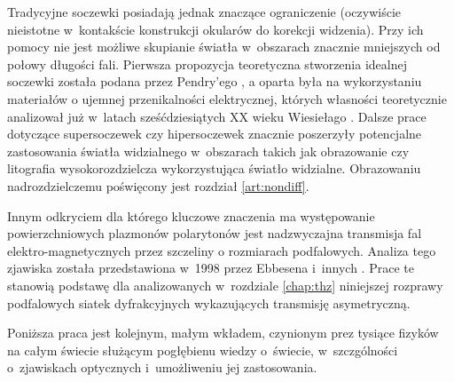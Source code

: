 Tradycyjne soczewki posiadają jednak znaczące ograniczenie (oczywiście nieistotne w~kontakście konstrukcji okularów do korekcji widzenia). Przy ich pomocy nie jest możliwe skupianie światła w~obszarach znacznie mniejszych od połowy długości fali. Pierwsza propozycja teoretyczna stworzenia idealnej soczewki została podana przez Pendry'ego \cite{PhysRevLett.85.3966}, a oparta była na wykorzystaniu materiałów o ujemnej przenikalności elektrycznej, których własności teoretycznie analizował już w~latach sześćdziesiątych XX wieku Wiesiełago \cite{veselago1968electrodynamics}. Dalsze prace dotyczące supersoczewek czy hipersoczewek \cite{liu2007far} znacznie poszerzyły potencjalne zastosowania światła widzialnego w~obszarach takich jak obrazowanie czy litografia wysokorozdzielcza wykorzystująca światło widzialne. Obrazowaniu nadrozdzielczemu poświęcony jest rozdział \ref{art:nondiff}.

Innym odkryciem dla którego kluczowe znaczenia ma występowanie powierzchniowych plazmonów polarytonów jest nadzwyczajna transmisja fal elektro-magnetycznych przez szczeliny o rozmiarach podfalowych. Analiza tego zjawiska została przedstawiona w~1998 przez Ebbesena i~innych \cite{ebbesen1998extraordinary,1998APS..MAR.S1511E}. Prace te stanowią podstawę dla analizowanych w~rozdziale \ref{chap:thz} niniejszej rozprawy podfalowych siatek dyfrakcyjnych wykazujących transmisję asymetryczną.

Poniższa praca jest kolejnym, małym wkładem, czynionym prez tysiące fizyków na całym świecie służącym pogłębienu wiedzy o~świecie, w~szczgólności o~zjawiskach optycznych i~umożliweniu jej zastosowania.

